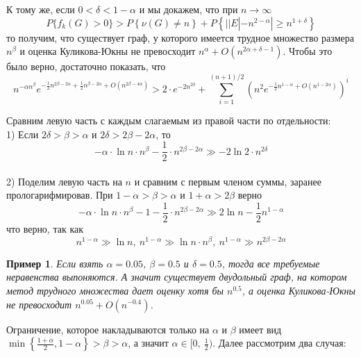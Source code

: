 \documentclass[a4paper]{article}
\newtheorem*{mexample}{Пример}
\begin{document}
К тому же, если $0 < \delta < 1 - \alpha$ и мы докажем, что при $n \rightarrow \infty$ $$P\{f_k(G) > 0\} > P\left\{\nu(G) \neq n\right\} + P\left\{||E| - n^{2-\alpha}| \geq
n^{1+\delta}\right\}$$ то получим, что существует граф, у которого имеется трудное множество 
размера $n^\beta$ и оценка Куликова-Юкны не превосходит $n^{\alpha} + O(n^{2\alpha + \delta-1})$. Чтобы это было верно, достаточно показать, что 
$$n^{-\alpha n^{\beta}} e^{-\frac{1}{2}n^{2\beta-2\alpha} + \frac{1}{2}n^{\beta - 2\alpha} + O(n^{2\beta - 4\alpha})} > 
2\cdot e^{-2n^{2\delta}} + \sum\limits_{i=1}^{(n+1)/2}\left(n^2e^{-\frac{1}{2}n^{1-\alpha} + O(n^{1-2\alpha})}\right)^i$$

Сравним левую часть с каждым слагаемым из правой части по отдельности:\ \\
1) Если $2\delta > \beta > \alpha$ и $2\delta > 2\beta - 2\alpha$, то $$-\alpha\cdot \ln{n}\cdot n^{\beta} - 
\frac{1}{2}\cdot n^{2\beta - 2\alpha} \gg -2\ln{2}\cdot n^{2\delta}$$\ \\
2) Поделим левую часть на $n$ и сравним с первым членом суммы, заранее прологарифмировав. При 
$1-\alpha > \beta > \alpha$ и $1+\alpha > 2\beta$ верно $$-\alpha\cdot \ln{n}\cdot n^{\beta} - 1 -
\frac{1}{2}\cdot n^{2\beta - 2\alpha} \gg 2\ln{n} - \frac{1}{2}n^{1-\alpha}$$ что верно, так как 
$$n^{1-\alpha} \gg \ln{n},\ n^{1-\alpha} \gg \ln{n}\cdot n^{\beta},\ n^{1-\alpha} \gg n^{2\beta - 2\alpha}$$

\begin{mexample}
    Если взять $\alpha = 0.05$, $\beta = 0.5$ и $\delta = 0.5$, тогда все требуемые неравенства выпоняются.
    А значит существует двудольный граф, на котором метод трудного множества дает оценку хотя бы $n^{0.5}$, а  
    оценка Куликова-Юкны не превосходит $n^{0.05} + O(n^{-0.4})$.
\end{mexample}


Ограничение, которое накладываются только на $\alpha$ и $\beta$ имеет вид $\min\left\{\frac{1+\alpha}{2},
1-\alpha\right\} > \beta > \alpha$, а значит $\alpha \in [0,\ \frac{1}{2})$. Далее рассмотрим два случая:
\end{document}

